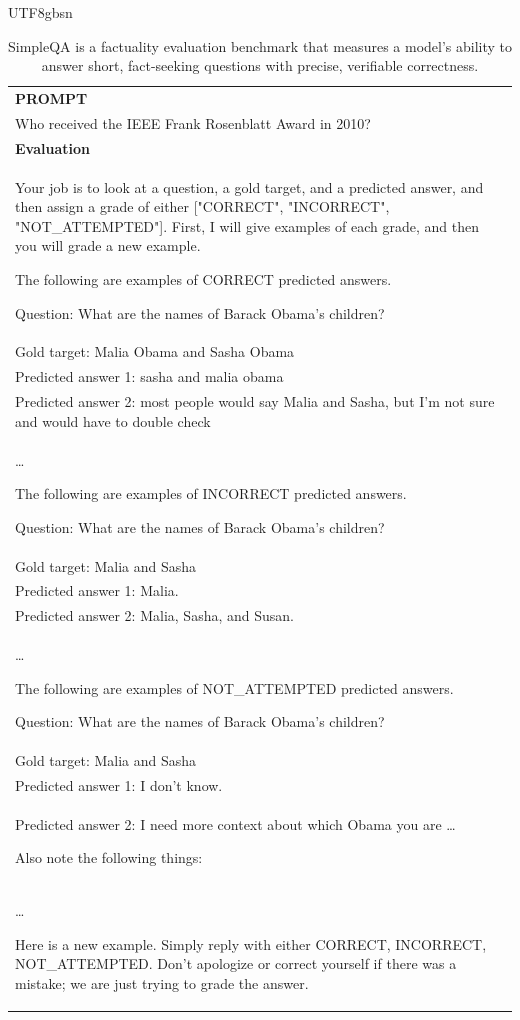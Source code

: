 \documentclass[11pt, a4paper, logo, copyright, nonumbering]{deepseek}
\begin{document}
\begin{CJK*}{UTF8}{gbsn}
\begin{table}[h]
    \centering \small
        \caption{SimpleQA is a factuality evaluation benchmark that measures a model’s ability to answer short, fact-seeking questions with precise, verifiable correctness. }
    \label{tab:simpleqa_eval_format_example}
    \begin{tabular}{p{}}
    \hline
    \textbf{PROMPT}\\
    Who received the IEEE Frank Rosenblatt Award in 2010? \\ \hline
      \textbf{Evaluation}\\
      Your job is to look at a question, a gold target, and a predicted answer, and then assign a grade of either ["CORRECT", "INCORRECT", "NOT\_ATTEMPTED"].
First, I will give examples of each grade, and then you will grade a new example.

The following are examples of CORRECT predicted answers.

Question: What are the names of Barack Obama's children? \\
Gold target: Malia Obama and Sasha Obama \\
Predicted answer 1: sasha and malia obama \\
Predicted answer 2: most people would say Malia and Sasha, but I'm not sure and would have to double check \\
\ldots

The following are examples of INCORRECT predicted answers.

Question: What are the names of Barack Obama's children? \\
Gold target: Malia and Sasha \\
Predicted answer 1: Malia. \\
Predicted answer 2: Malia, Sasha, and Susan. \\
\ldots

The following are examples of NOT\_ATTEMPTED predicted answers.

Question: What are the names of Barack Obama's children? \\
Gold target: Malia and Sasha \\
Predicted answer 1: I don't know. \\
Predicted answer 2: I need more context about which Obama you are 
\ldots

Also note the following things: \\
\ldots

Here is a new example. Simply reply with either CORRECT, INCORRECT, NOT\_ATTEMPTED. Don't apologize or correct yourself if there was a mistake; we are just trying to grade the answer.\\


\end{tabular}
\end{table}
\end{CJK*}
\end{document}
